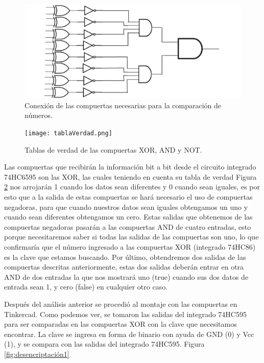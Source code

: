 \documentclass{article}
\begin{document}
\begin{figure}[h]
\includegraphics[scale=0.2]{compuertas.png}
\centering
\caption{Conexión de las compuertas necesarias para la comparación de números.}
\label{fig:compuertas}
\end{figure}

\begin{figure}[h]
\texttt{[image: tablaVerdad.png]}
\centering
\caption{Tablas de verdad de las compuertas XOR, AND y NOT.}
\label{fig:TablaVerdad}
\end{figure}

Las compuertas que recibirán la información bit a bit desde el circuito integrado 74HC6595 son las XOR, las cuales teniendo en cuenta su tabla de verdad Figura \ref{fig:TablaVerdad} nos arrojarán 1 cuando los datos sean diferentes y 0 cuando sean iguales, es por esto que a la salida de estas compuertas se hará necesario el uso de compuertas negadoras, para que cuando nuestros datos sean iguales obtengamos un uno y cuando sean diferentes obtengamos un cero. Estas salidas que obtenemos de las compuertas negadoras pasarán a las compuertas AND de cuatro entradas, esto porque necesitaremos saber si todas las salidas de las compuertas son uno, lo que confirmaría que el número ingresado a las compuertas XOR (integrado 74HC86) es la clave que estamos buscando. Por último, obtendremos dos salidas de las compuertas descritas anteriormente, estas dos salidas deberán entrar en otra AND de dos entradas la que nos mostrará uno (true) cuando sus dos datos de entrada sean 1, y cero (false) en cualquier otro caso. 


Después del análisis anterior se procedió al montaje con las compuertas en Tinkercad. Como podemos ver, se tomaron las salidas del integrado 74HC595 para ser comparadas en las compuertas XOR con la clave que necesitamos encontrar. La clave se ingresa en forma de binario con ayuda de GND (0) y Vcc (1), y se compara con las salidas del integrado 74HC595. Figura \ref{fig:desencriptación1}
\end{document}
